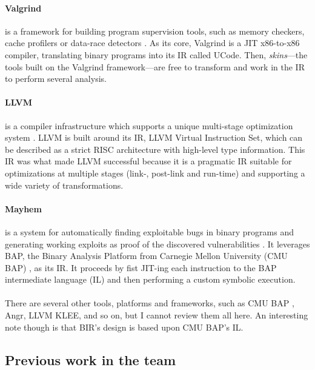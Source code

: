 \documentclass{kththesis}
\begin{document}
\paragraph{Valgrind} is a framework for building program supervision tools, such as memory checkers, cache profilers or data-race detectors
\cite{nethercote_valgrind:_2003}. As its core, Valgrind is a JIT x86-to-x86 compiler, translating binary programs into its IR called UCode. Then, \textit{skins}---the tools built on the Valgrind framework---are free to transform and work in the IR to perform several analysis.

\paragraph{LLVM} is a compiler infrastructure which supports a unique multi-stage optimization system \cite{lattner_llvm:_2002}. LLVM is built around its IR, LLVM Virtual Instruction Set, which can be described as a strict RISC architecture with high-level type information. This IR was what made LLVM successful because it is a pragmatic IR suitable for optimizations at multiple stages (link-, post-link and run-time) and supporting a wide variety of transformations.

\paragraph{Mayhem} is a system for automatically finding exploitable bugs in binary programs and generating working exploits as proof of the discovered vulnerabilities \cite{cha_unleashing_2012}. It leverages BAP, the Binary Analysis Platform from Carnegie Mellon University (CMU BAP) \cite{brumley_bap:_2011}, as its IR. It proceeds by fist JIT-ing each instruction to the BAP intermediate language (IL) and then performing a custom symbolic execution.

\paragraph{} There are several other tools, platforms and frameworks, such as CMU BAP \cite{noauthor_binary_2019}, Angr, LLVM KLEE, and so on, but I cannot review them all here. An interesting note though is that BIR's design is based upon CMU BAP's IL.

\subsection{Previous work in the team}
\end{document}
